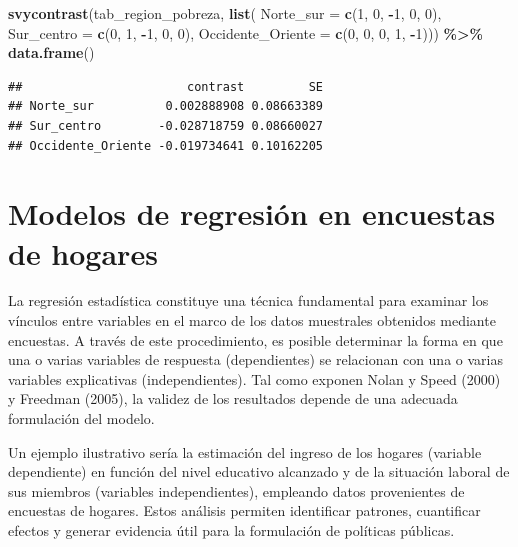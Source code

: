 \documentclass[
  spanish,
  12pt,
]{book}
\newenvironment{Shaded}{\begin{snugshade}}{\end{snugshade}}
\newcommand{\AttributeTok}[1]{\textcolor[rgb]{0.13,0.29,0.53}{#1}}
\newcommand{\DecValTok}[1]{\textcolor[rgb]{0.00,0.00,0.81}{#1}}
\newcommand{\FunctionTok}[1]{\textcolor[rgb]{0.13,0.29,0.53}{\textbf{#1}}}
\newcommand{\NormalTok}[1]{#1}
\newcommand{\SpecialCharTok}[1]{\textcolor[rgb]{0.81,0.36,0.00}{\textbf{#1}}}
\begin{document}
\begin{Shaded}
\begin{Highlighting}[]
\FunctionTok{svycontrast}\NormalTok{(tab\_region\_pobreza, }\FunctionTok{list}\NormalTok{(}
                \AttributeTok{Norte\_sur =} \FunctionTok{c}\NormalTok{(}\DecValTok{1}\NormalTok{, }\DecValTok{0}\NormalTok{, }\SpecialCharTok{{-}}\DecValTok{1}\NormalTok{, }\DecValTok{0}\NormalTok{, }\DecValTok{0}\NormalTok{),}
                \AttributeTok{Sur\_centro =} \FunctionTok{c}\NormalTok{(}\DecValTok{0}\NormalTok{, }\DecValTok{1}\NormalTok{, }\SpecialCharTok{{-}}\DecValTok{1}\NormalTok{, }\DecValTok{0}\NormalTok{, }\DecValTok{0}\NormalTok{),}
                \AttributeTok{Occidente\_Oriente =} \FunctionTok{c}\NormalTok{(}\DecValTok{0}\NormalTok{, }\DecValTok{0}\NormalTok{, }\DecValTok{0}\NormalTok{, }\DecValTok{1}\NormalTok{, }\SpecialCharTok{{-}}\DecValTok{1}\NormalTok{))) }\SpecialCharTok{\%\textgreater{}\%} \FunctionTok{data.frame}\NormalTok{()}
\end{Highlighting}
\end{Shaded}

\begin{verbatim}
##                       contrast         SE
## Norte_sur          0.002888908 0.08663389
## Sur_centro        -0.028718759 0.08660027
## Occidente_Oriente -0.019734641 0.10162205
\end{verbatim}

\section{Modelos de regresión en encuestas de hogares}\label{modelos-de-regresiuxf3n-en-encuestas-de-hogares}

La regresión estadística constituye una técnica fundamental para examinar los vínculos entre variables en el marco de los datos muestrales obtenidos mediante encuestas. A través de este procedimiento, es posible determinar la forma en que una o varias variables de respuesta (dependientes) se relacionan con una o varias variables explicativas (independientes). Tal como exponen Nolan y Speed (2000) y Freedman (2005), la validez de los resultados depende de una adecuada formulación del modelo.

Un ejemplo ilustrativo sería la estimación del ingreso de los hogares (variable dependiente) en función del nivel educativo alcanzado y de la situación laboral de sus miembros (variables independientes), empleando datos provenientes de encuestas de hogares. Estos análisis permiten identificar patrones, cuantificar efectos y generar evidencia útil para la formulación de políticas públicas.
\end{document}
